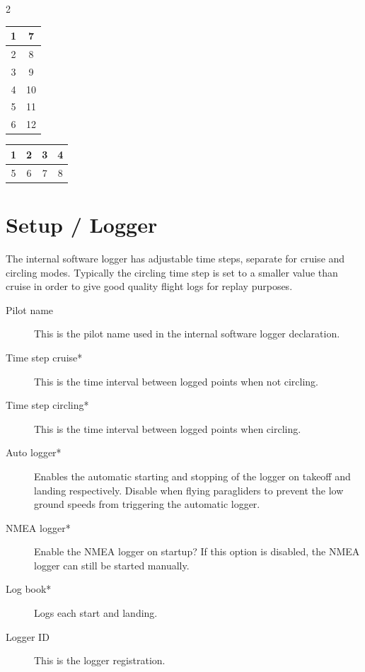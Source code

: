 \begin{multicols}{2}
\begin{tabular}{|c|c|}
\hline
1 & 7 \\
\hline
2 & 8 \\
\hline
3 & 9 \\
\hline
4 & 10 \\
\hline
5 & 11 \\
\hline
6 & 12 \\
\hline
\end{tabular}

\begin{tabular}{|c|c|c|c|}
\hline
1 & 2 & 3 & 4 \\
\hline
\hline
5 & 6 & 7 & 8 \\
\hline
\end{tabular}
\end{multicols}


\section{Setup / Logger} \label{conf:logger}

The internal software logger has adjustable time steps, separate for
cruise and circling modes.  
Typically the circling time step is set to a smaller value
than cruise in order to give good quality flight logs for replay
purposes.

\begin{description}
\item[Pilot name]  This is the pilot name used in the internal software logger 
  declaration.
\item[Time step cruise*]  This is the time interval between logged points when 
  not circling. 
\item[Time step circling*]  This is the time interval between logged points when 
  circling. 
\item[Auto logger*]  Enables the automatic starting and stopping of the logger
  on takeoff and landing respectively. Disable when flying paragliders to prevent 
  the low ground speeds from triggering the automatic logger.
\item[NMEA logger*]  Enable the NMEA logger on startup? If this option is disabled, 
  the NMEA logger can still be started manually.
\item[Log book*]  Logs each start and landing.
\item[Logger ID]  This is the logger registration.
\end{description}



